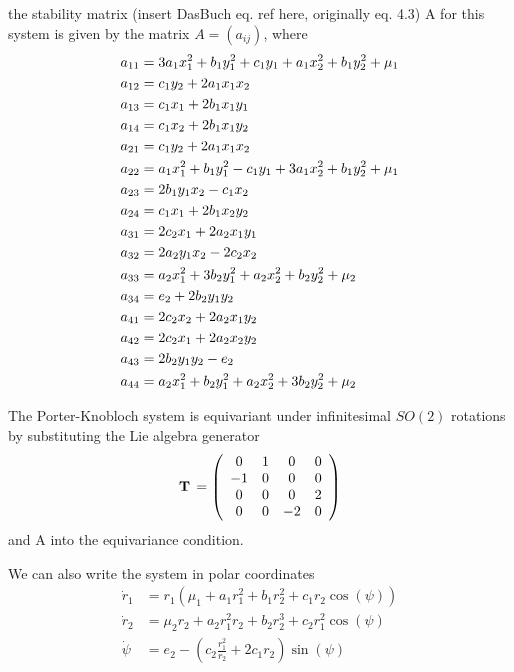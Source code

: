 \documentclass{article}
\begin{document}
the stability matrix ({insert DasBuch eq. ref here, originally eq. 4.3}) A for this 				system is given by the matrix $A=(a_{ij})$, where
\begin{align}
a_{11}&=3 a_1 x_1^2 + b_1 y_1^2 + c_1 y_1 + a_1 x_2^2 + b_1 y_2^2 + \mu_1\\
a_{12}&=c_1 y_2 + 2 a_1 x_1 x_2\\
a_{13}&=c_1 x_1 + 2 b_1 x_1 y_1\\
a_{14}&=c_1 x_2 + 2 b_1 x_1 y_2\\
a_{21}&=c_1 y_2 + 2 a_1 x_1 x_2\\
a_{22}&=a_1 x_1^2 + b_1 y_1^2 - c_1 y_1 + 3 a_1 x_2^2 + b_1 y_2^2 + \mu_1\\
a_{23}&=2 b_1 y_1 x_2 - c_1 x_2\\
a_{24}&=c_1 x_1 + 2 b_1 x_2 y_2\\
a_{31}&=2 c_2 x_1 + 2 a_2 x_1 y_1\\
a_{32}&=2 a_2 y_1 x_2 - 2 c_2 x_2\\
a_{33}&=a_2 x_1^2 + 3 b_2 y_1^2 + a_2 x_2^2 + b_2 y_2^2 + \mu_2\\
a_{34}&=e_2 + 2 b_2 y_1 y_2\\
a_{41}&= 2 c_2 x_2 + 2 a_2 x_1 y_2\\
a_{42}&=2 c_2 x_1 + 2 a_2 x_2 y_2\\
a_{43}&= 2 b_2 y_1 y_2 - e_2\\
a_{44}&=a_2 x_1^2 + b_2 y_1^2 + a_2 x_2^2 + 3 b_2 y_2^2 + \mu_2
\label{{2modeStabMatrix}}
\end{align}

The Porter-Knobloch system is equivariant under infinitesimal $SO(2)$
rotations by substituting the Lie algebra generator
    \begin{equation}
\mathbf{T}  \, =
\left( \begin{array}{cccc}
         0 & 1 & 0 & 0 \\
        -1 & 0 & 0 & 0 \\
         0 & 0 & 0 & 2\\
         0 & 0 & -2 & 0
      \end{array} \right)
\label{{LGTwoMode}}
\end{equation}
and A into the equivariance condition.

We can also write the system in polar coordinates
\begin{align}
\dot{r}_1&=r_1(\mu_1+a_1r_1^2+b_1r_2^2+c_1r_2\cos(\psi))\\
\dot{r}_2&=\mu_2r_2+a_2r_1^2r_2+b_2r_2^3+c_2r_1^2\cos(\psi)\\
\dot{\psi}&=e_2-(c_2\frac{r_1^2}{r_2}+2c_1r_2)\sin(\psi)
\end{align}
\end{document}

